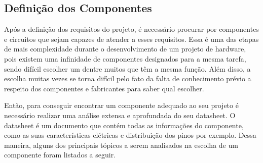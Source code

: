 \subsection{Definição dos Componentes}

Após a definição dos requisitos do projeto, é necessário procurar por componentes e circuitos que sejam capazes de atender a esses requisitos. Essa é uma das etapas de mais complexidade durante o desenvolvimento de um projeto de hardware, pois existem uma infinidade de componentes designados para a mesma tarefa, sendo difícil escolher um dentre muitos que têm a mesma função.  Além disso, a escolha muitas vezes se torna  difícil pelo fato da falta de conhecimento prévio a respeito dos componentes e fabricantes  para saber qual escolher.

Então, para conseguir encontrar um componente adequado ao seu projeto é necessário realizar uma análise extensa e aprofundada do seu datasheet. O datasheet é um documento que contém todas as informações do componente, como as suas características elétricas e distribuição dos pinos por exemplo. Dessa maneira, alguns dos principais tópicos a serem analisados na escolha de um componente foram listados a seguir. 

